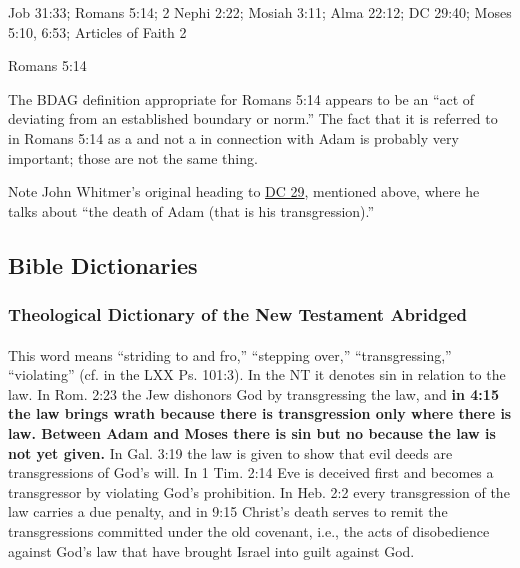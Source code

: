 	\begin{compactdesc}
		\item[transgression of Adam] Job 31:33; Romans 5:14; 2 Nephi 2:22; Mosiah 3:11; Alma 22:12; DC 29:40; Moses 5:10, 6:53; Articles of Faith 2
			\begin{compactdesc}
				\item[Bible anchor verses] Romans 5:14
					\begin{compactdesc}
						\item[Romans 5:14] 
					\end{compactdesc}
				\item[Commentary] \phantom{.}
					\begin{compactitem}
						\item The BDAG definition appropriate for Romans 5:14 appears to be an ``act of deviating from an established boundary or norm.'' The fact that it is referred to in Romans 5:14 as a  and not a  in connection with Adam is probably very important; those are not the same thing.
						\item Note John Whitmer's original heading to \hyperref[DC29]{DC 29}, mentioned above, where he talks about ``the death of Adam (that is his transgression).''
					\end{compactitem}
			\end{compactdesc}
	\end{compactdesc}
	
\subsection{Bible Dictionaries} %
	\label{TRANSGRESSION-BD}
	
		\subsubsection{Theological Dictionary of the New Testament Abridged}
			\label{TRANSGRESSION-BD-TDNTA}
		
			\paragraph{\texorpdfstring{}{}}
			
				This word means ``striding to and fro,'' ``stepping over,'' ``transgressing,'' ``violating'' (cf. in the LXX Ps. 101:3). In the NT it denotes sin in relation to the law. In Rom. 2:23 the Jew dishonors God by transgressing the law, and \textbf{in 4:15 the law brings wrath because there is transgression only where there is law. Between Adam and Moses there is sin but no  because the law is not yet given.} In Gal. 3:19 the law is given to show that evil deeds are transgressions of God's will. In 1 Tim. 2:14 Eve is deceived first and becomes a transgressor by violating God's prohibition. In Heb. 2:2 every transgression of the law carries a due penalty, and in 9:15 Christ's death serves to remit the transgressions committed under the old covenant, i.e., the acts of disobedience against God's law that have brought Israel into guilt against God. 

